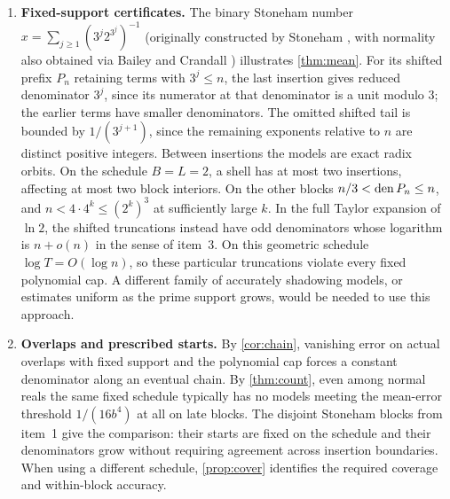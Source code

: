 \documentclass[11pt]{article}
\begin{document}
\begin{enumerate}[leftmargin=*,label=\textbf{\arabic*.}]
\item \textbf{Fixed-support certificates.}
The binary Stoneham number \(x=\sum_{j\ge1}(3^j2^{3^j})^{-1}\) (originally constructed by Stoneham \cite{stoneham}, with normality also obtained via Bailey and Crandall \cite[Theorem~4.8, p.~535]{bailey}) illustrates \cref{thm:mean}. For its shifted prefix \(P_n\) retaining terms with \(3^j\le n\), the last insertion gives reduced denominator \(3^j\), since its numerator at that denominator is a unit modulo \(3\); the earlier terms have smaller denominators. The omitted shifted tail is bounded by \(1/(3^{j+1})\), since the remaining exponents relative to \(n\) are distinct positive integers. Between insertions the models are exact radix orbits. On the schedule \(B=L=2\), a shell has at most two insertions, affecting at most two block interiors. On the other blocks \(n/3<\operatorname{den} P_n\le n\), and \(n<4\cdot4^k\le (2^k)^3\) at sufficiently large \(k\). In the full Taylor expansion of \(\ln 2\), the shifted truncations instead have odd denominators whose logarithm is \(n+o(n)\) in the sense of item~3. On this geometric schedule \(\log T=O(\log n)\), so these particular truncations violate every fixed polynomial cap. A different family of accurately shadowing models, or estimates uniform as the prime support grows, would be needed to use this approach.

\item \textbf{Overlaps and prescribed starts.}
By \cref{cor:chain}, vanishing error on actual overlaps with fixed support and the polynomial cap forces a constant denominator along an eventual chain. By \cref{thm:count}, even among normal reals the same fixed schedule typically has no models meeting the mean-error threshold \(1/(16b^4)\) at all on late blocks. The disjoint Stoneham blocks from item~1 give the comparison: their starts are fixed on the schedule and their denominators grow without requiring agreement across insertion boundaries. When using a different schedule, \cref{prop:cover} identifies the required coverage and within-block accuracy.


\end{enumerate}
\end{document}
